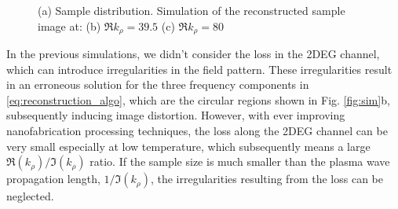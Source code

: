 \documentclass[10pt]{article}
\renewcommand{\^}{\hat}  %
\newcommand{\p}{\rho}  %
\renewcommand{\^}{\hat}  %
\begin{document}
%
\begin{figure}[t!]
  \centering
  \caption{(a) Sample distribution. Simulation of the reconstructed sample image at: (b) $\Re k_{\p} = 39.5$ (c) $\Re k_{\p} = 80$}
  \label{fig:simulation}
\end{figure}
In the previous simulations, we didn't consider the loss in the 2DEG channel, which can introduce irregularities in the field pattern. These irregularities result in an erroneous solution for the three frequency components in \eqref{eq:reconstruction_algo}, which are the circular regions shown in Fig. \ref{fig:sim}b, subsequently inducing image distortion. However, with ever improving nanofabrication processing techniques, the loss along the 2DEG channel can be very small especially at low temperature, which subsequently means a large $\Re(k_{\p})/\Im(k_{\p})$ ratio. If the sample size is much smaller than the plasma wave propagation length, $1/\Im(k_{\p})$, the irregularities resulting from the loss can be neglected.
\end{document}
